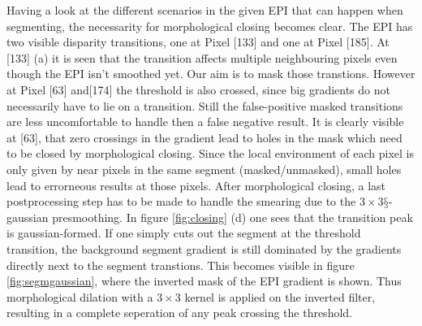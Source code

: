 \documentclass  [
  paper    = a4,
  BCOR     = 10mm,
  twoside,
  fontsize = 12pt,
  fleqn,
  toc      = bibnumbered,
  toc      = listofnumbered,
  numbers  = noendperiod,
  headings = normal,
  listof   = leveldown,
  version  = 3.03
]                                       {scrreprt}
\begin{document}
 Having a look at the different scenarios in the given EPI that can happen when segmenting, the necessarity for morphological closing becomes clear. The EPI has two visible disparity transitions, one at Pixel [133] and one at Pixel [185]. At [133] (a) it is seen that the transition affects multiple neighbouring pixels even though the EPI isn't smoothed yet. Our aim is to mask those transtions. However at Pixel [63] and[174] the threshold is also crossed, since big gradients do not necessarily have to lie on a transition. Still the false-positive masked transitions are less uncomfortable to handle then a false negative result. It is clearly visible at [63], that zero crossings in the gradient lead to holes in the mask which need to be closed by morphological closing. Since the local environment of each pixel is only given by near pixels in the same segment (masked/unmasked), small holes lead to errorneous results at those pixels. After morphological closing, a last postprocessing step has to be made to handle the smearing due to the $3\times 3§$-gaussian presmoothing. In figure \ref{fig:closing} (d) one sees that the transition peak is gaussian-formed. If one simply cuts out the segment at the threshold transition, the background segment gradient is still dominated by the gradients directly next to the segment transtions. This becomes visible in figure \ref{fig:segmgaussian}, where the inverted mask of the EPI gradient is shown. Thus morphological dilation with a $3\times3$ kernel is applied on the inverted filter, resulting in a complete seperation of any peak crossing the threshold.
 
 
 
\end{document}
